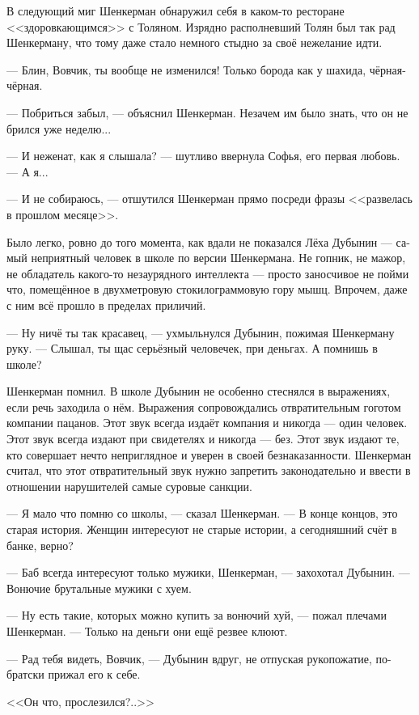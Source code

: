 \documentclass[a5paper,12pt,fleqn]{extbook}\usepackage{cooltooltips}\usepackage{polyglossia}\setdefaultlanguage[babelshorthands=true]{russian}\setotherlanguage{english}\defaultfontfeatures{Ligatures=TeX,Mapping=tex-text} \usepackage{xcolor}\definecolor{lightgray}{HTML}{bbbbbb}\color{lightgray}\newcommand{\ml}[3]{\textenglish{\textcolor{black}{#3}}}
\begin{document}
В следующий миг Шенкерман обнаружил себя в каком-то ресторане <<здоровкающимся>> с Толяном.
Изрядно располневший Толян был так рад Шенкерману, что тому даже стало немного стыдно за своё нежелание идти.

--- Блин, Вовчик, ты вообще не изменился!
Только борода как у шахида, чёрная-чёрная.

--- Побриться забыл, --- объяснил Шенкерман.
Незачем им было знать, что он не брился уже неделю...

--- И неженат, как я слышала? --- шутливо ввернула Софья, его первая любовь.
--- А я...

--- И не собираюсь, --- отшутился Шенкерман прямо посреди фразы <<развелась в прошлом месяце>>.

Было легко, ровно до того момента, как вдали не показался Лёха Дубынин --- самый неприятный человек в школе по версии Шенкермана.
Не гопник, не мажор, не обладатель какого-то незаурядного интеллекта --- просто заносчивое не пойми что, помещённое в двухметровую стокилограммовую гору мышц.
Впрочем, даже с ним всё прошло в пределах приличий.

--- Ну ничё ты так красавец, --- ухмыльнулся Дубынин, пожимая Шенкерману руку.
--- Слышал, ты щас серьёзный человечек, при деньгах.
А помнишь в школе?

Шенкерман помнил.
В школе Дубынин не особенно стеснялся в выражениях, если речь заходила о нём.
Выражения сопровождались отвратительным гоготом компании пацанов.
Этот звук всегда издаёт компания и никогда --- один человек.
Этот звук всегда издают при свидетелях и никогда --- без.
Этот звук издают те, кто совершает нечто неприглядное и уверен в своей безнаказанности.
Шенкерман считал, что этот отвратительный звук нужно запретить законодательно и ввести в отношении нарушителей самые суровые санкции.

--- Я мало что помню со школы, --- сказал Шенкерман.
--- В конце концов, это старая история.
Женщин интересуют не старые истории, а сегодняшний счёт в банке, верно?

--- Баб всегда интересуют только мужики, Шенкерман, --- захохотал Дубынин.
--- Вонючие брутальные мужики с хуем.

--- Ну есть такие, которых можно купить за вонючий хуй, --- пожал плечами Шенкерман.
--- Только на деньги они ещё резвее клюют.

--- Рад тебя видеть, Вовчик, --- Дубынин вдруг, не отпуская рукопожатие, по-братски прижал его к себе.

<<Он что, прослезился?..>>
\end{document}
